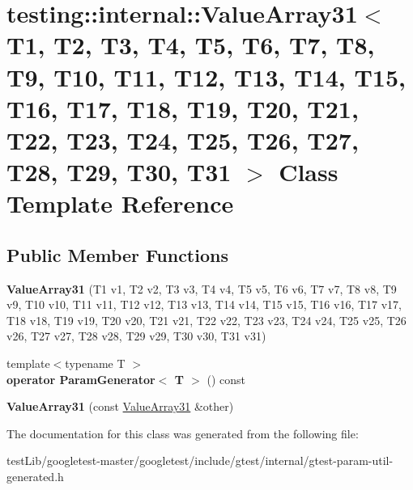\hypertarget{classtesting_1_1internal_1_1ValueArray31}{}\section{testing\+:\+:internal\+:\+:Value\+Array31$<$ T1, T2, T3, T4, T5, T6, T7, T8, T9, T10, T11, T12, T13, T14, T15, T16, T17, T18, T19, T20, T21, T22, T23, T24, T25, T26, T27, T28, T29, T30, T31 $>$ Class Template Reference}
\label{classtesting_1_1internal_1_1ValueArray31}
\subsection*{Public Member Functions}
\begin{DoxyCompactItemize}
\item 
\mbox{\label{classtesting_1_1internal_1_1ValueArray31_a0b4568d1e7c636368a2f4785e3417b83}} 
{\bfseries Value\+Array31} (T1 v1, T2 v2, T3 v3, T4 v4, T5 v5, T6 v6, T7 v7, T8 v8, T9 v9, T10 v10, T11 v11, T12 v12, T13 v13, T14 v14, T15 v15, T16 v16, T17 v17, T18 v18, T19 v19, T20 v20, T21 v21, T22 v22, T23 v23, T24 v24, T25 v25, T26 v26, T27 v27, T28 v28, T29 v29, T30 v30, T31 v31)
\item 
\mbox{\label{classtesting_1_1internal_1_1ValueArray31_aea678c0e845c38d83200e9b7e6e27265}} 
{\footnotesize template$<$typename T $>$ }\\{\bfseries operator Param\+Generator$<$ T $>$} () const
\item 
\mbox{\label{classtesting_1_1internal_1_1ValueArray31_ac80965505dcb3374d68e8af54a71ad23}} 
{\bfseries Value\+Array31} (const \hyperlink{classtesting_1_1internal_1_1ValueArray31}{Value\+Array31} \&other)
\end{DoxyCompactItemize}


The documentation for this class was generated from the following file\+:\begin{DoxyCompactItemize}
\item 
test\+Lib/googletest-\/master/googletest/include/gtest/internal/gtest-\/param-\/util-\/generated.\+h\end{DoxyCompactItemize}
